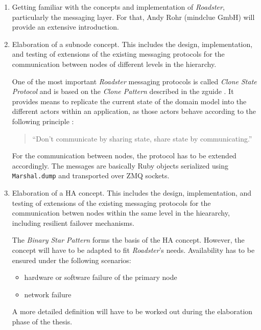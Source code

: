 \documentclass[a4paper]{article}
\newcommand{\rb}[1]{\lstinline[style=customruby]{#1}} %
\begin{document}
\begin{enumerate}
	\item Getting familiar with the concepts and implementation of
		\emph{Roadster}, particularly the messaging layer. For that,
		Andy Rohr (mindclue GmbH) will provide an extensive
		introduction.

	\item Elaboration of a subnode concept. This includes the design,
		implementation, and testing of extensions of the existing
		messaging protocols for the communication between nodes of
		different levels in the hierarchy.

		One of the most important \emph{Roadster} messaging protocols
		is called \emph{Clone State Protocol} and is based on the
		\emph{Clone Pattern} described in the zguide
		\cite{zguide:clone-pattern}. It provides means to replicate the
		current state of the domain model into the different actors
		within an application, as those actors behave according to the
		following principle \cite{golang:sharemem}:

		\begin{quote}
		``Don't communicate by sharing state, share state by communicating.''
		\end{quote}

		For the communication between nodes, the protocol has to be
		extended accordingly. The messages are basically Ruby objects
		serialized using \rb{Marshal.dump} and transported over ZMQ
		sockets.

	\item Elaboration of a HA concept. This includes the design,
		implementation, and testing of extensions of the existing
		messaging protocols for the communication betwen nodes within
		the same level in the hieararchy, including resilient failover
		mechanisms.

		The \emph{Binary Star Pattern}
		\cite{zguide:binary-star}\cite{zguide:adding-binary-star} forms
		the basis of the HA concept. However, the concept will have to
		be adapted to fit \emph{Roadster}'s needs. Availability has to
		be ensured under the following scenarios:

		\begin{itemize}
			\item hardware or software failure of the primary node
			\item network failure
		\end{itemize}

		A more detailed definition will have to be worked out during
		the elaboration phase of the thesis.


\end{enumerate}
\end{document}
